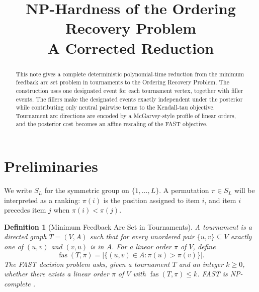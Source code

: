 \documentclass[11pt]{article}
\title{NP-Hardness of the Ordering Recovery Problem\\
\large A Corrected Reduction}
\author{}
\date{}
\newtheorem{definition}{Definition}
\newcommand{\fas}{\operatorname{fas}}
\begin{document}
\maketitle

\begin{abstract}
This note gives a complete deterministic polynomial-time reduction from the minimum feedback arc set problem in tournaments to the Ordering Recovery Problem.  The construction uses one designated event for each tournament vertex, together with filler events.  The fillers make the designated events exactly independent under the posterior while contributing only neutral pairwise terms to the Kendall-tau objective.  Tournament arc directions are encoded by a McGarvey-style profile of linear orders, and the posterior cost becomes an affine rescaling of the FAST objective.
\end{abstract}

\section{Preliminaries}

We write $S_L$ for the symmetric group on $\{1,\ldots,L\}$.  A permutation $\pi \in S_L$ will be interpreted as a ranking: $\pi(i)$ is the position assigned to item $i$, and item $i$ precedes item $j$ when $\pi(i)<\pi(j)$.

\begin{definition}[Minimum Feedback Arc Set in Tournaments]
A tournament is a directed graph $T=(V,A)$ such that for every unordered pair $\{u,v\}\subseteq V$ exactly one of $(u,v)$ and $(v,u)$ is in $A$.  For a linear order $\pi$ of $V$, define
\begin{equation}
  \fas(T,\pi)=\left|\{(u,v)\in A: \pi(u)>\pi(v)\}\right| .
\end{equation}
The FAST decision problem asks, given a tournament $T$ and an integer $k\ge 0$, whether there exists a linear order $\pi$ of $V$ with $\fas(T,\pi)\le k$.  FAST is NP-complete \cite{Alon2006,Charbit2007}.
\end{definition}
\end{document}
